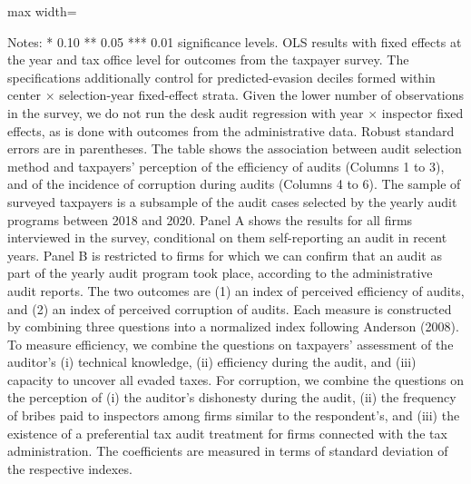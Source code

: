 \documentclass{article}
\newcommand{\OutPath}{Output/}%
\newcommand{\OutPath}{../Output/}%
\begin{document}
\begin{table}[H]\centering
\begin{adjustbox}{max width=\textwidth}
\begin{threeparttable}
\caption{Algorithm Selection, Perceived Audit Efficiency and Corruption, with Predicted Evasion Decile Controls}
\label{tab:table6_indices_yhatrf_deciles_control}

\footnotesize


\begin{tablenotes}[flushleft]
\footnotesize
\item Notes: * 0.10 ** 0.05 *** 0.01 significance levels. OLS results with fixed effects at the year and tax office level for outcomes from the taxpayer survey. The specifications additionally control for predicted-evasion deciles formed within center $\times$ selection-year fixed-effect strata. Given the lower number of observations in the survey, we do not run the desk audit regression with year $\times$ inspector fixed effects, as is done with outcomes from the administrative data. Robust standard errors are in parentheses. The table shows the association between audit selection method and taxpayers' perception of the efficiency of audits (Columns 1 to 3), and of the incidence of corruption during audits (Columns 4 to 6). The sample of surveyed taxpayers is a subsample of the audit cases selected by the yearly audit programs between 2018 and 2020. Panel A shows the results for all firms interviewed in the survey, conditional on them self-reporting an audit in recent years. Panel B is restricted to firms for which we can confirm that an audit as part of the yearly audit program took place, according to the administrative audit reports. The two outcomes are (1) an index of perceived efficiency of audits, and (2) an index of perceived corruption of audits. Each measure is constructed by combining three questions into a normalized index following Anderson (2008). To measure efficiency, we combine the questions on taxpayers' assessment of the auditor's (i) technical knowledge, (ii) efficiency during the audit, and (iii) capacity to uncover all evaded taxes. For corruption, we combine the questions on the perception of (i) the auditor's dishonesty during the audit, (ii) the frequency of bribes paid to inspectors among firms similar to the respondent's, and (iii) the existence of a preferential tax audit treatment for firms connected with the tax administration. The coefficients are measured in terms of standard deviation of the respective indexes.
\end{tablenotes}
\end{threeparttable}
\end{adjustbox}
\end{table}
\end{document}
